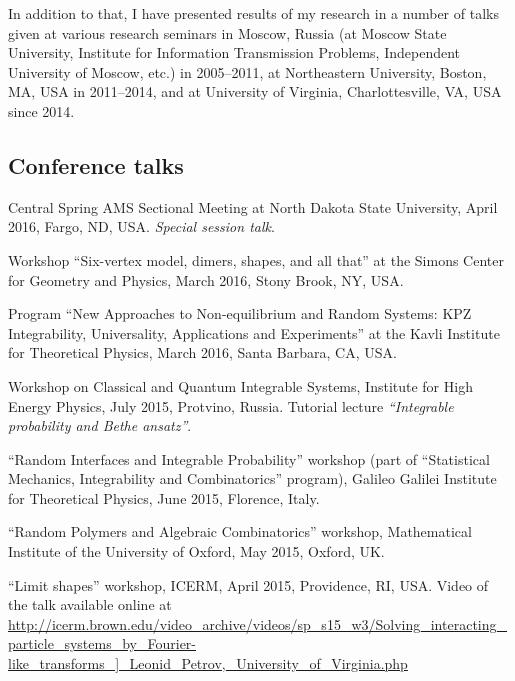 \documentclass[letterpaper,11pt]{article}
\begin{document}
In addition to that, I have presented results of my research in a number of talks given at various research seminars in Moscow, Russia (at Moscow State University, Institute for Information Transmission Problems, Independent University of Moscow, etc.) in 2005--2011, at Northeastern University, Boston, MA, USA in 2011--2014, and
at University of Virginia, Charlottesville, VA, USA since 2014.

\subsection*{Conference talks}

\begin{etaremune}

\item Central Spring AMS Sectional Meeting 
at 
North Dakota State University, April 2016, 
Fargo, ND, USA. \emph{Special session talk}.

\item 
Workshop 
``Six-vertex model, dimers, shapes, and all that''
at the
Simons Center for Geometry and Physics,
March 2016, Stony Brook, NY, USA.

\item 
Program ``New Approaches to Non-equilibrium and Random Systems: 
KPZ Integrability, Universality, Applications and Experiments''
at the Kavli Institute for Theoretical Physics, 
March 2016, Santa Barbara, CA, USA.

\item Workshop on Classical and Quantum Integrable Systems, 
Institute for High Energy Physics, July 2015, Protvino, Russia.
Tutorial lecture \emph{``Integrable probability and Bethe ansatz''}.

\item 
``Random Interfaces and Integrable Probability'' workshop (part of 
``Statistical Mechanics, Integrability and Combinatorics'' program), 
Galileo Galilei Institute for Theoretical Physics, June 2015, Florence, Italy.

\item ``Random Polymers and Algebraic Combinatorics'' workshop, 
Mathematical Institute of the University of Oxford, May 2015, Oxford, UK.

\item ``Limit shapes'' workshop, ICERM, April 2015, Providence, RI, USA. Video of the talk available 
online at 
\url{http://icerm.brown.edu/video_archive/videos/sp_s15_w3/Solving_interacting_particle_systems_by_Fourier-like_transforms_]_Leonid_Petrov,_University_of_Virginia.php}


\end{etaremune}
\end{document}
